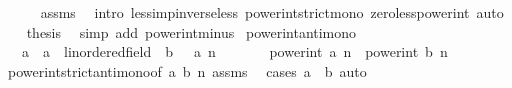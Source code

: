 \begin{isabellebody}
\ \ \ \ \isamarkupfalse%
\ assms\ \isamarkupfalse%
\ {\isacharparenleft}{\kern0pt}intro\ less{\isacharunderscore}{\kern0pt}imp{\isacharunderscore}{\kern0pt}inverse{\isacharunderscore}{\kern0pt}less\ power{\isacharunderscore}{\kern0pt}int{\isacharunderscore}{\kern0pt}strict{\isacharunderscore}{\kern0pt}mono\ zero{\isacharunderscore}{\kern0pt}less{\isacharunderscore}{\kern0pt}power{\isacharunderscore}{\kern0pt}int{\isacharparenright}{\kern0pt}\ auto\isanewline
\ \ \isamarkupfalse%
\ {\isacharquery}{\kern0pt}thesis\ \isamarkupfalse%
\ {\isacharparenleft}{\kern0pt}simp\ add{\isacharcolon}{\kern0pt}\ power{\isacharunderscore}{\kern0pt}int{\isacharunderscore}{\kern0pt}minus{\isacharparenright}{\kern0pt}\isanewline
{}\isamarkupfalse%
%
\endisatagproof
{\isafoldproof}%
%
\isadelimproof
\isanewline
%
\endisadelimproof
\isanewline
{}\isamarkupfalse%
\ power{\isacharunderscore}{\kern0pt}int{\isacharunderscore}{\kern0pt}antimono{\isacharcolon}{\kern0pt}\isanewline
\ \ \ {\isachardoublequoteopen}{\isacharparenleft}{\kern0pt}a\ {\isacharcolon}{\kern0pt}{\isacharcolon}{\kern0pt}\ {\isacharprime}{\kern0pt}a\ {\isacharcolon}{\kern0pt}{\isacharcolon}{\kern0pt}\ linordered{\isacharunderscore}{\kern0pt}field{\isacharparenright}{\kern0pt}\ {\isasymle}\ b{\isachardoublequoteclose}\ {\isachardoublequoteopen}{}\ {\isacharless}{\kern0pt}\ a{\isachardoublequoteclose}\ {\isachardoublequoteopen}n\ {\isacharless}{\kern0pt}\ {}{\isachardoublequoteclose}\isanewline
\ \ \ \ \ {\isachardoublequoteopen}power{\isacharunderscore}{\kern0pt}int\ a\ n\ {\isasymge}\ power{\isacharunderscore}{\kern0pt}int\ b\ n{\isachardoublequoteclose}\isanewline
%
\isadelimproof
\ \ %
\endisadelimproof
%
\isatagproof
{}\isamarkupfalse%
\ power{\isacharunderscore}{\kern0pt}int{\isacharunderscore}{\kern0pt}strict{\isacharunderscore}{\kern0pt}antimono{\isacharbrackleft}{\kern0pt}of\ a\ b\ n{\isacharbrackright}{\kern0pt}\ assms\ \isamarkupfalse%
\ {\isacharparenleft}{\kern0pt}cases\ {\isachardoublequoteopen}a\ {\isacharequal}{\kern0pt}\ b{\isachardoublequoteclose}{\isacharparenright}{\kern0pt}\ auto%
\endisatagproof
{\isafoldproof}%
%
\isadelimproof
\isanewline
%
\endisadelimproof
\isanewline
{}\isamarkupfalse%
%
\isadelimdocument
%
\endisadelimdocument
%
\isatagdocument
%
\isamarkuptrue%
%
\endisatagdocument
{\isafolddocument}%
%
\isadelimdocument
%
\endisadelimdocument

\end{isabellebody}
